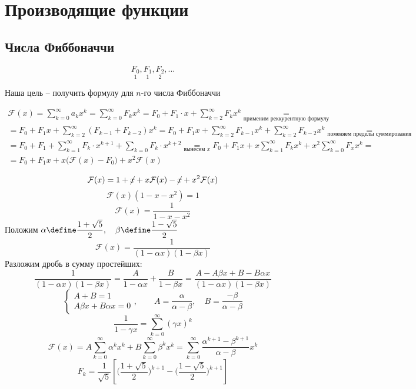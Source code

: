\section{Производящие функции}

\subsection{Числа Фиббоначчи}

$$ \underset1{F_0}, \underset1{F_1}, \underset2{F_2}, ... $$

Наша цель -- получить формулу для $ n $-го числа Фиббоначчи

\begin{multline*}
    \mathcal{F}(x) = \sum_{k = 0}^\infty a_kx^k = \sum_{k = 0}^\infty F_kx^k = F_0 + F_1 \cdot x + \sum_{k = 2}^\infty F_kx^k \underset{\text{применим реккурентную формулу}}= \\
    = F_0 + F_1x + \sum_{k = 2}^\infty(F_{k - 1} + F_{k - 2})x^k = F_0 + F_1x + \sum_{k = 2}^\infty F_{k - 1}x^k + \sum_{k = 2}^\infty F_{k - 2}x^k \underset{\text{поменяем пределы суммирования}} = \\
    = F_0 + F_1 + \sum_{k = 1}^\infty F_k \cdot x^{k + 1} + \sum_{k = 0}F_k \cdot x^{k + 2} \underset{\text{вынесем } x}= F_0 + F_1x + x\sum_{k = 1}^\infty F_kx^k + x^2\sum_{k = 0}^\infty F_xx^k = \\
    = F_0 + F_1x + x \bigg( \mathcal{F}(x) - F_0 \bigg) + x^2 \mathcal{F}(x)
\end{multline*}

$$ \mathcal{F}(x) = 1 + \cancel{x} + x \mathcal{F}(x) - \cancel{x} + x^2 \mathcal{F}(x) $$
$$ \mathcal{F}(x)(1 - x - x^2) = 1 $$
$$ \mathcal{F}(x) = \frac1{1 - x - x^2} $$
Положим $ \alpha \define \dfrac{1 + \sqrt5}2, \quad \beta \define \dfrac{1 - \sqrt5}2 $
$$ \mathcal{F}(x) = \frac1{(1 - \alpha x)(1 - \beta x)} $$
Разложим дробь в сумму простейших:
$$ \frac1{(1 - \alpha x)(1 - \beta x)} = \frac{A}{1 - \alpha x} + \frac{B}{1 - \beta x} = \frac{A - A \beta x + B - B \alpha x}{(1 - \alpha x)(1 - \beta x)} $$
$$
\begin{cases}
	A + B = 1 \\
    A \beta x + B \alpha x = 0
\end{cases}, \qquad A = \frac\alpha{\alpha - \beta}, \quad B = \frac{-\beta}{\alpha - \beta} $$
$$ \frac1{1 - \gamma x} = \sum_{k = 0}^\infty (\gamma x)^k $$
$$ \mathcal{F}(x) = A \sum_{k = 0}^\infty \alpha^k x^k + B \sum_{k = 0}^\infty \beta^k x^k = \sum_{k = 0}^\infty \frac{\alpha^{k + 1} - \beta^{k + 1}}{\alpha - \beta}x^k $$
$$ F_k = \frac1{\sqrt5} \left[ \bigg( \frac{1 + \sqrt5}2 \bigg)^{k + 1} - \bigg( \frac{1 - \sqrt5}2 \bigg)^{k + 1} \right] $$

